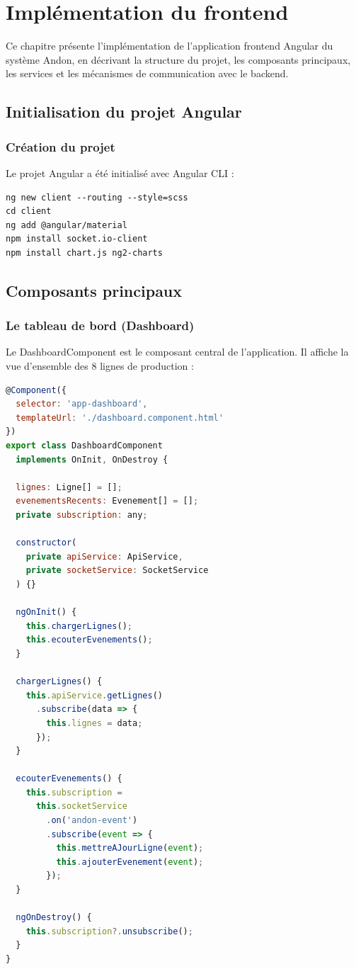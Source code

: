 \chapter{Impl\'ementation du frontend}

Ce chapitre pr\'esente l'impl\'ementation de l'application frontend Angular du syst\`eme Andon, en d\'ecrivant la structure du projet, les composants principaux, les services et les m\'ecanismes de communication avec le backend.

\section{Initialisation du projet Angular}

\subsection{Cr\'eation du projet}

Le projet Angular a \'et\'e initialis\'e avec Angular CLI :

\begin{lstlisting}[caption={Cr\'eation du projet Angular},label={lst:ng_new}]
ng new client --routing --style=scss
cd client
ng add @angular/material
npm install socket.io-client
npm install chart.js ng2-charts
\end{lstlisting}

\section{Composants principaux}

\subsection{Le tableau de bord (Dashboard)}

Le DashboardComponent est le composant central de l'application. Il affiche la vue d'ensemble des 8 lignes de production :

\begin{lstlisting}[language=JavaScript,
caption={Composant Dashboard},label={lst:dashboard_comp}]
@Component({
  selector: 'app-dashboard',
  templateUrl: './dashboard.component.html'
})
export class DashboardComponent 
  implements OnInit, OnDestroy {
  
  lignes: Ligne[] = [];
  evenementsRecents: Evenement[] = [];
  private subscription: any;

  constructor(
    private apiService: ApiService,
    private socketService: SocketService
  ) {}

  ngOnInit() {
    this.chargerLignes();
    this.ecouterEvenements();
  }

  chargerLignes() {
    this.apiService.getLignes()
      .subscribe(data => {
        this.lignes = data;
      });
  }

  ecouterEvenements() {
    this.subscription = 
      this.socketService
        .on('andon-event')
        .subscribe(event => {
          this.mettreAJourLigne(event);
          this.ajouterEvenement(event);
        });
  }

  ngOnDestroy() {
    this.subscription?.unsubscribe();
  }
}
\end{lstlisting}

